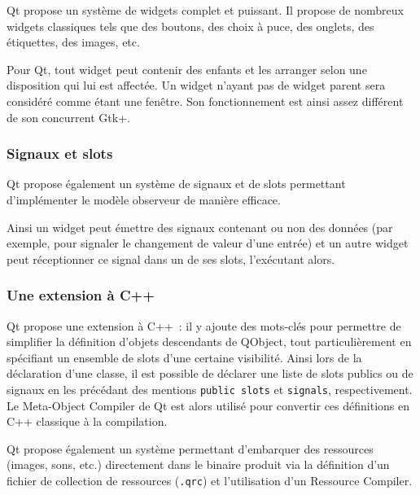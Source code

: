 Qt propose un système de widgets complet et puissant. Il propose de nombreux widgets classiques tels que des boutons, des choix à puce, des onglets, des étiquettes, des images, etc.

Pour Qt, tout widget peut contenir des enfants et les arranger selon une disposition qui lui est affectée. Un widget n'ayant pas de widget parent sera considéré comme étant une fenêtre.
Son fonctionnement est ainsi assez différent de son concurrent Gtk+.

\subsubsection{Signaux et slots}

Qt propose également un système de signaux et de slots permettant d'implémenter le modèle observeur de manière efficace.%

Ainsi un widget peut émettre des signaux contenant ou non des données (par exemple, pour signaler le changement de valeur d'une entrée) et un autre widget peut réceptionner ce signal dans un de ses slots, l'exécutant alors. %

\subsubsection{Une extension à C++}

Qt propose une extension à C++~: il y ajoute des mots-clés pour permettre de simplifier la définition d'objets descendants de QObject, tout particulièrement en spécifiant un ensemble de slots d'une certaine visibilité.
Ainsi lors de la déclaration d'une classe, il est possible de déclarer une liste de slots publics ou de signaux en les précédant des mentions \verb|public slots| et \verb|signals|, respectivement.
Le Meta-Object Compiler de Qt est alors utilisé pour convertir ces définitions en C++ classique à la compilation.

Qt propose également un système permettant d'embarquer des ressources (images, sons, etc.) directement dans le binaire produit via la définition d'un fichier de collection de ressources (\verb|.qrc|) et l'utilisation d'un Ressource Compiler.

